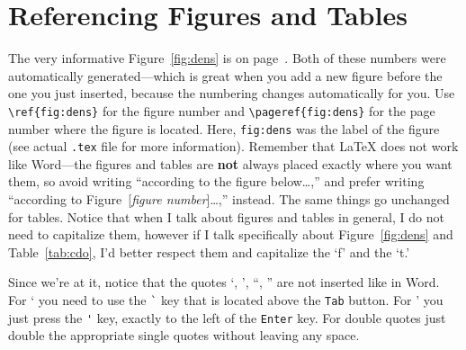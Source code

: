 \section{Referencing Figures and Tables}
The very informative Figure~\ref{fig:dens} is on page~\pageref{fig:dens}. Both of these numbers were automatically generated---which is great when you add a new figure before the one you just inserted, because the numbering changes automatically for you. Use \verb|\ref{fig:dens}| for the figure number and \verb|\pageref{fig:dens}| for the page number where the figure is located. Here, \verb|fig:dens| was the label of the figure (see actual \verb|.tex| file for more information). Remember that \LaTeX{} does not work like Word---the figures and tables are \textbf{not} always placed exactly where you want them, so avoid writing ``according to the figure below\ldots,'' and prefer writing ``according to Figure~[\emph{figure number}]\ldots,'' instead. The same things go unchanged for tables. Notice that when I talk about figures and tables in general, I do not need to capitalize them, however if I talk specifically about Figure~\ref{fig:dens} and Table~\ref{tab:cdo}, I'd better respect them and capitalize the `f' and the `t.'

Since we're at it, notice that the quotes `, ', ``, '' are not inserted like in Word. For ` you need to use the \verb|`| key that is located above the \verb|Tab| button. For ' you just press the \verb|'| key, exactly to the left of the \verb|Enter| key. For double quotes just double the appropriate single quotes without leaving any space.

